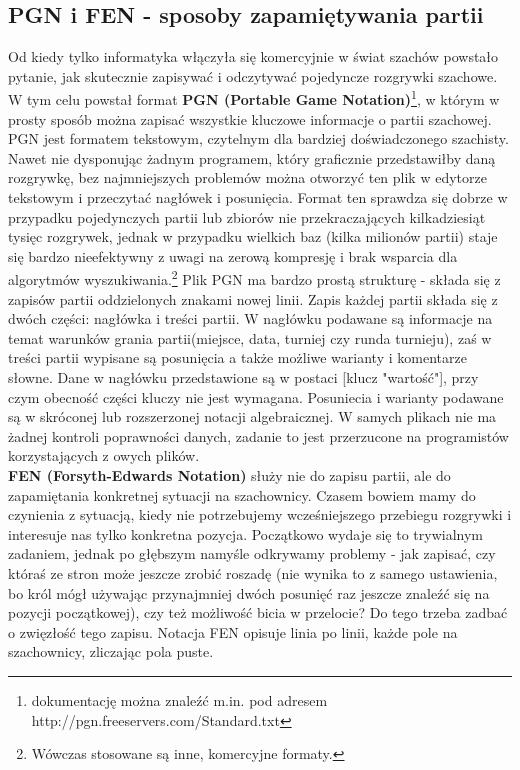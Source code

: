 \documentclass[12pt,leqno]{article}
\begin{document}
\subsection{PGN i FEN - sposoby zapamiętywania partii}
Od kiedy tylko informatyka włączyła się komercyjnie w świat szachów powstało pytanie, jak skutecznie zapisywać i odczytywać pojedyncze rozgrywki szachowe.  W tym celu powstał  format {\bf PGN (Portable Game Notation)}\footnote{dokumentację można znaleźć m.in. pod adresem http://pgn.freeservers.com/Standard.txt}, w którym w prosty sposób można zapisać wszystkie kluczowe informacje o partii szachowej. \\
PGN jest formatem tekstowym, czytelnym dla bardziej doświadczonego szachisty. Nawet nie dysponując żadnym programem, który graficznie przedstawiłby daną rozgrywkę, bez najmniejszych problemów można otworzyć ten plik w edytorze tekstowym i przeczytać nagłówek i posunięcia. Format ten sprawdza się dobrze w przypadku pojedynczych partii lub zbiorów nie przekraczających kilkadziesiąt tysięc rozgrywek, jednak w przypadku wielkich baz (kilka milionów partii) staje się bardzo nieefektywny z uwagi na zerową kompresję i brak wsparcia dla algorytmów wyszukiwania.\footnote {Wówczas stosowane są inne, komercyjne formaty. }
Plik PGN ma bardzo prostą strukturę - składa się z zapisów partii oddzielonych znakami nowej linii. Zapis każdej partii składa się z dwóch części: nagłówka i treści partii. W nagłówku podawane są informacje na temat warunków grania partii(miejsce, data, turniej czy runda turnieju), zaś w treści partii wypisane są posunięcia a także możliwe warianty i komentarze słowne. Dane w nagłówku przedstawione są w postaci [klucz "wartość"], przy czym obecność części kluczy nie jest wymagana. Posuniecia i warianty podawane są w skróconej lub rozszerzonej notacji algebraicznej. W samych plikach nie ma żadnej kontroli poprawności danych, zadanie to jest przerzucone na programistów korzystających z owych plików.\\
{\bf FEN (Forsyth-Edwards Notation)} służy nie do zapisu partii, ale do zapamiętania konkretnej sytuacji na szachownicy. Czasem bowiem mamy do czynienia z sytuacją, kiedy nie potrzebujemy wcześniejszego przebiegu rozgrywki i interesuje nas tylko konkretna pozycja. Początkowo wydaje się to trywialnym zadaniem, jednak po głębszym namyśle odkrywamy problemy - jak zapisać, czy któraś ze stron może jeszcze zrobić roszadę (nie wynika to z samego ustawienia, bo król mógł używając przynajmniej dwóch posunięć raz jeszcze znaleźć się na pozycji początkowej), czy też możliwość bicia w przelocie? Do tego trzeba zadbać o zwięzłość tego zapisu. Notacja FEN opisuje linia po linii, każde pole na szachownicy, zliczając pola puste. \\
\end{document}
